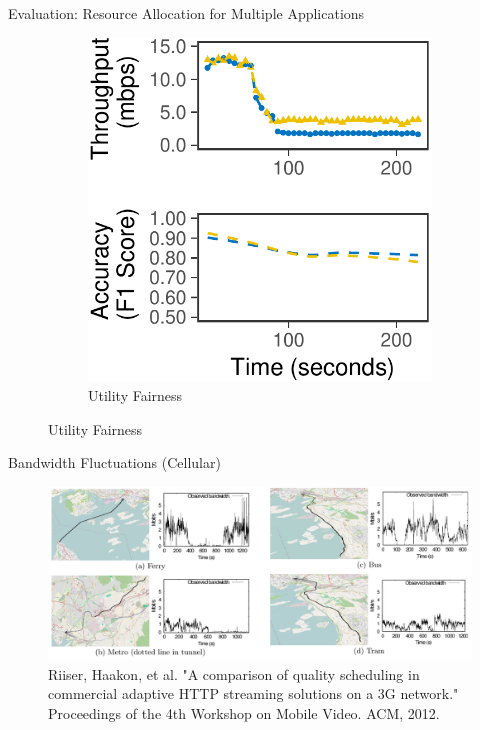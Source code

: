 \begin{frame}{Evaluation: Resource Allocation for Multiple Applications}
\begin{figure}
\begin{subfigure}[t]{0.45\columnwidth}
      \includegraphics[width=\textwidth]{figures/multitask-right.pdf}
      \caption{Utility Fairness}
      \label{fig:eq-acc}
    \end{subfigure}
  \end{figure}
\end{frame}

\begin{frame}{Bandwidth Fluctuations (Cellular)}
  \begin{figure}
    \includegraphics[width=\textwidth]{figures/bandwidth-cellular.pdf}
    \caption{Riiser, Haakon, et al. "A comparison of quality scheduling in
      commercial adaptive HTTP streaming solutions on a 3G network."
      Proceedings of the 4th Workshop on Mobile Video. ACM, 2012.}
  \end{figure}
\end{frame}

